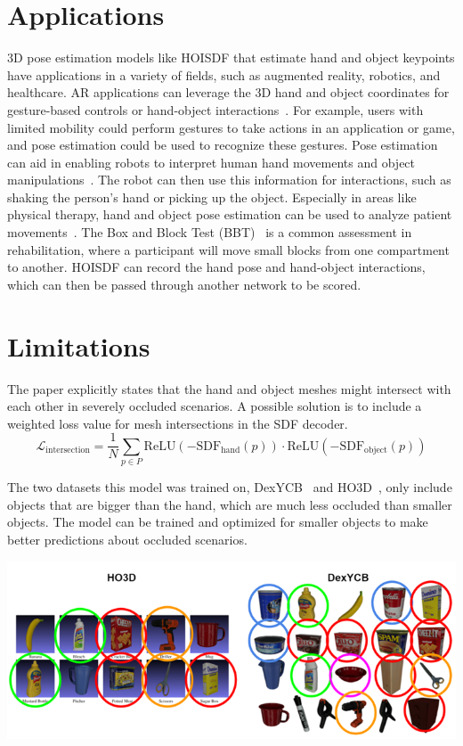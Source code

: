 \documentclass{article}
\begin{document}
\section*{Applications}

3D pose estimation models like HOISDF that estimate hand and object keypoints have applications in a variety of fields, such as augmented reality, robotics, and healthcare. AR applications can leverage the 3D hand and object coordinates for gesture-based controls or hand-object interactions~\cite{chen2019augmentedreality}. For example, users with limited mobility could perform gestures to take actions in an application or game, and pose estimation could be used to recognize these gestures. Pose estimation can aid in enabling robots to interpret human hand movements and object manipulations~\cite{billard2019robotics}. The robot can then use this information for interactions, such as shaking the person's hand or picking up the object. Especially in areas like physical therapy, hand and object pose estimation can be used to analyze patient movements~\cite{stenum2021health}. The Box and Block Test (BBT)~\cite{mathiowetz1985boxblock} is a common assessment in rehabilitation, where a participant will move small blocks from one compartment to another. HOISDF can record the hand pose and hand-object interactions, which can then be passed through another network to be scored.

\section*{Limitations}

The paper explicitly states that the hand and object meshes might intersect with each other in severely occluded scenarios. A possible solution is to include a weighted loss value for mesh intersections in the SDF decoder.
\[\mathcal{L}_\text{intersection}=\frac{1}{N}\sum_{p\in P} \text{ReLU}(-\text{SDF}_\text{hand}(p))\cdot \text{ReLU}(-\text{SDF}_\text{object}(p))\]

The two datasets this model was trained on, DexYCB~\cite{chao2021dexycb} and HO3D~\cite{hampali2020honnotate}, only include objects that are bigger than the hand, which are much less occluded than smaller objects. The model can be trained and optimized for smaller objects to make better predictions about occluded scenarios.

\begin{center}
    \includegraphics[scale=1]{hoisdf-5.png}
\end{center}
\end{document}
